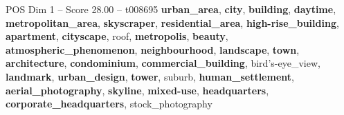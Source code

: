 \begin{textsample}{POS Dim 1 – Score 28.00 – t008695}  \label{ex:f1_pos_004}
\textbf{urban\_area}, \textbf{city}, \textbf{building}, \textbf{daytime}, \textbf{metropolitan\_area}, \textbf{skyscraper}, \textbf{residential\_area}, \textbf{high-rise\_building}, \textbf{apartment}, \textbf{cityscape}, roof, \textbf{metropolis}, \textbf{beauty}, \textbf{atmospheric\_phenomenon}, \textbf{neighbourhood}, \textbf{landscape}, \textbf{town}, \textbf{architecture}, \textbf{condominium}, \textbf{commercial\_building}, bird's-eye\_view, \textbf{landmark}, \textbf{urban\_design}, \textbf{tower}, suburb, \textbf{human\_settlement}, \textbf{aerial\_photography}, \textbf{skyline}, \textbf{mixed-use}, \textbf{headquarters}, \textbf{corporate\_headquarters}, stock\_photography

\end{textsample}
